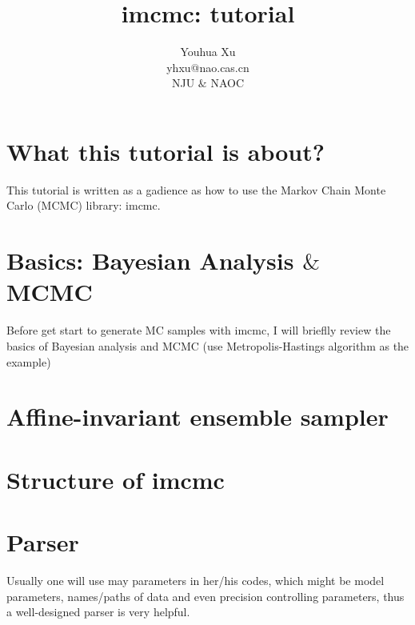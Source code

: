 \documentclass[11pt,a4paper]{article}
\title{imcmc: tutorial}
\author{Youhua Xu\\
	yhxu@nao.cas.cn\\
	NJU $\&$ NAOC}
\begin{document}
\maketitle

\section{What this tutorial is about?}
This tutorial is written as a gadience as how to use the Markov Chain Monte Carlo (MCMC) library: imcmc.

\section{Basics: Bayesian Analysis $\&$ MCMC}
Before get start to generate MC samples with imcmc, I will brieflly review the basics of Bayesian analysis and MCMC (use Metropolis-Hastings algorithm as the example)


\section{Affine-invariant ensemble sampler}

\section{Structure of \textbf{imcmc}}


\section{Parser}
Usually one will use may parameters in her/his codes, which might be model parameters, names/paths of data and even precision
controlling parameters, thus a well-designed parser is very helpful.
\end{document}
